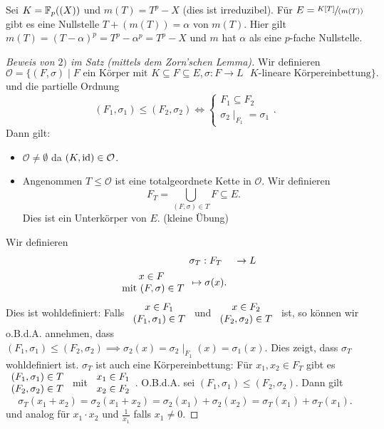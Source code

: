 \begin{eg}
	Sei $K = \mathbb{F}_{p}((X))$ und $m(T) = T^{p} - X$ (dies ist irreduzibel).
	Für $E = \sfrac{K[T]}{(m(T))}$ gibt es eine Nullstelle $T + (m(T)) = \alpha$ von $m(T)$.
	Hier gilt $m(T) = (T - \alpha)^{p} = T^{p} - \alpha^{p} = T^{p} - X$ und $m$ hat $\alpha$ als eine $p$-fache Nullstelle.
\end{eg}

\begin{proof}[Beweis von $2)$ im Satz (mittels dem Zorn'schen Lemma)]
	Wir definieren
	\[
		\mathcal{O} = \{(F,\sigma) \mid F \text{ ein Körper mit } K \subseteq F \subseteq E, \sigma: F \to  L \text{ $K$-lineare Körpereinbettung}\} 
	.\] 
	und die partielle Ordnung
	\[
		(F_1,\sigma_1) \leq (F_2,\sigma_2) \Leftrightarrow \begin{cases}
			F_1 \subseteq F_2\\
			\sigma_{2} \mid_{F_1} = \sigma_1
		\end{cases}
	.\]
	Dann gilt:
	\begin{itemize}
		\item $\mathcal{O} \neq \emptyset$ da $(K,\operatorname{id}) \in \mathcal{O}$.
		\item Angenommen $T \leq \mathcal{O}$ ist eine totalgeordnete Kette in $\mathcal{O}$. Wir definieren
			\[
				F_{T} = \bigcup_{(F,\sigma) \in T} F \subseteq E
			.\] 
			Dies ist ein Unterkörper von $E$. (kleine Übung)
	\end{itemize}
	Wir definieren
	\begin{align*}
		&\sigma_{T}: F_{T} &\to L\\
		\begin{array}{c} x \in F\\ \text{ mit } (F,\sigma) \in T\\ \end{array} &\mapsto \sigma(x)
	.\end{align*}
	Dies ist wohldefiniert: Falls $\begin{array}{c} x \in F_1\\ (F_1,\sigma_1) \in T\\ \end{array}$ und $\begin{array}{c} x \in F_2\\ (F_2,\sigma_2) \in T\\ \end{array}$ ist, so können wir o.B.d.A. annehmen,
	dass $(F_1,\sigma_1) \leq (F_2,\sigma_2) \implies \sigma_2(x) = \sigma_2 \mid_{F_1} (x) = \sigma_1(x)$.
	Dies zeigt, dass $\sigma_{T}$ wohldefiniert ist.
	$\sigma_{T}$ ist auch eine Körpereinbettung:
	Für $x_1,x_2 \in F_{T}$ gibt es $\begin{array}{c} (F_1,\sigma_1) \in T\\ (F_2,\sigma_2) \in T\\ \end{array}$ mit $\begin{array}{c} x_1 \in F_1\\ x_2 \in F_2\\ \end{array}$.
	O.B.d.A. sei $(F_1,\sigma_1) \leq (F_2,\sigma_2)$. Dann gilt
	\[
		\sigma_{T}(x_1+x_2) = \sigma_2(x_1+x_2) = \sigma_2(x_1) + \sigma_2(x_2) = \sigma_{T}(x_1) + \sigma_{T}(x_1)
	.\] 
	und analog für $x_1 \cdot x_2$ und $\frac{1}{x_1}$ falls $x_1 \neq 0$.


\end{proof}
